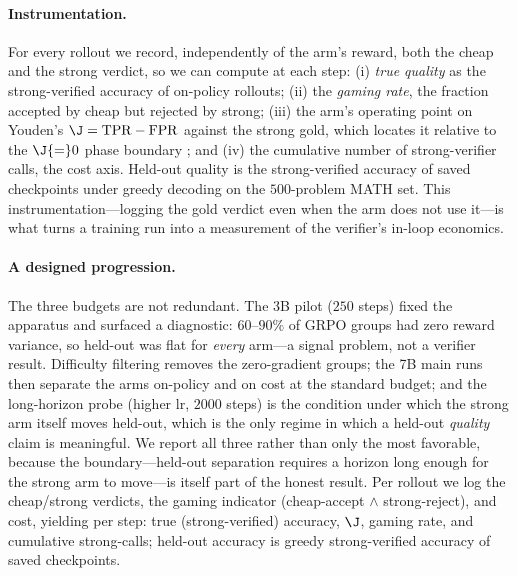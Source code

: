 \paragraph{Instrumentation.} For every rollout we record, independently of the arm's reward, both the cheap
and the strong verdict, so we can compute at each step: (i) \emph{true quality} as the strong-verified
accuracy of on-policy rollouts; (ii) the \emph{gaming rate}, the fraction accepted by cheap but rejected by
strong; (iii) the arm's operating point on Youden's $\J=\mathrm{TPR}-\mathrm{FPR}$ against the strong gold,
which locates it relative to the $\J{=}0$ phase boundary \citep{rateorfate2026}; and (iv) the cumulative
number of strong-verifier calls, the cost axis. Held-out quality is the strong-verified accuracy of saved
checkpoints under greedy decoding on the $500$-problem MATH set. This instrumentation---logging the gold
verdict even when the arm does not use it---is what turns a training run into a measurement of the verifier's
in-loop economics.

\paragraph{A designed progression.} The three budgets are not redundant. The 3B pilot ($250$ steps) fixed the
apparatus and surfaced a diagnostic: $60$--$90\%$ of GRPO groups had zero reward variance, so held-out was
flat for \emph{every} arm---a signal problem, not a verifier result. Difficulty filtering removes the
zero-gradient groups; the 7B main runs then separate the arms on-policy and on cost at the standard budget;
and the long-horizon probe (higher lr, $2000$ steps) is the condition under which the strong arm itself moves
held-out, which is the only regime in which a held-out \emph{quality} claim is meaningful. We report all
three rather than only the most favorable, because the boundary---held-out separation requires a horizon long
enough for the strong arm to move---is itself part of the honest result. Per rollout we log the cheap/strong verdicts, the gaming
indicator (cheap-accept $\wedge$ strong-reject), and cost, yielding per step: true (strong-verified) accuracy,
$\J$, gaming rate, and cumulative strong-calls; held-out accuracy is greedy strong-verified accuracy of saved
checkpoints.

